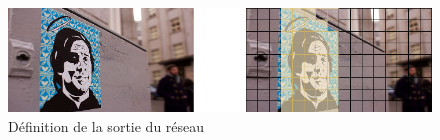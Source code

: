     \pagebreak
    \begin{figure}[H]
        \centering
        \includegraphics[width=15cm]{images/definition.png}
        \caption[Définition de la sortie du réseau]{Définition de la sortie du réseau\footnotemark}
        \label{fig:definition_sortie_reseau}
    \end{figure}
